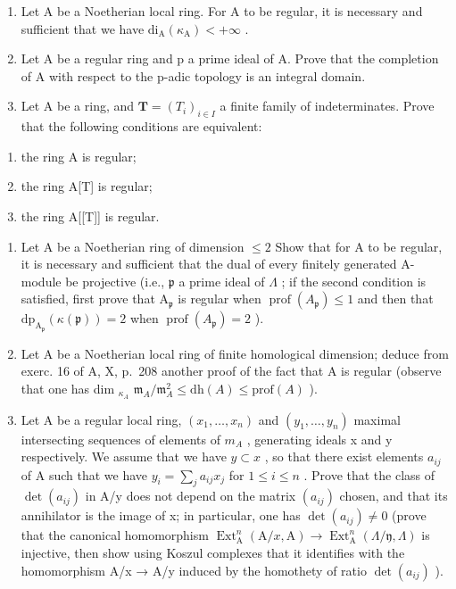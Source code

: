 
\begin{enumerate}
\def\labelenumi{\arabic{enumi})}
\item
  Let A be a Noetherian local ring. For A to be regular, it is necessary and sufficient that we have \(\mathrm{di}_{\mathrm{A}}(\kappa_{\mathrm{A}})<+\infty\) .
\item
  Let A be a regular ring and p a prime ideal of A. Prove that the completion of A with respect to the p-adic topology is an integral domain.
\item
  Let A be a ring, and \(\mathbf{T} = (T_i)_{i\in I}\) a finite family of indeterminates. Prove that the following conditions are equivalent:
\end{enumerate}

\begin{enumerate}
\def\labelenumi{(\roman{enumi})}
\item
  the ring A is regular;
\item
  the ring A{[}T{]} is regular;
\item
  the ring A{[}{[}T{]}{]} is regular.
\end{enumerate}

\begin{enumerate}
\def\labelenumi{\arabic{enumi})}
\setcounter{enumi}{3}
\item
  Let A be a Noetherian ring of dimension \(\leqslant 2\) Show that for A to be regular, it is necessary and sufficient that the dual of every finitely generated A-module be projective (i.e., \(\mathfrak{p}\) a prime ideal of \(\Lambda\) ; if the second condition is satisfied, first prove that \(\mathrm{A}_{\mathfrak{p}}\) is regular when \(\operatorname{prof}(A_{\mathfrak{p}}) \leqslant 1\) and then that \(\mathrm{dp}_{\mathrm{A}_{\mathfrak{p}}}(\kappa(\mathfrak{p})) = 2\) when \(\operatorname{prof}(A_{\mathfrak{p}}) = 2\) ).
\item
  Let A be a Noetherian local ring of finite homological dimension; deduce from exerc. 16 of A, X, p.~208 another proof of the fact that A is regular (observe that one has dim \(_{\kappa_A}\) \(\mathfrak{m}_A/\mathfrak{m}_A^2 \leqslant \mathrm{dh}(A) \leqslant \mathrm{prof}(A)\) ).
\item
  Let A be a regular local ring, \((x_{1},\ldots,x_{n})\) and \((y_{1},\ldots,y_{n})\) maximal intersecting sequences of elements of \(m_{A}\) , generating ideals x and y respectively. We assume that we have \(y \subset x\) , so that there exist elements \(a_{ij}\) of A such that we have \(y_{i} = \sum_{j} a_{ij} x_{j}\) for \(1 \leqslant i \leqslant n\) . Prove that the class of \(\det(a_{ij})\) in A/y does not depend on the matrix \((a_{ij})\) chosen, and that its annihilator is the image of x; in particular, one has \(\det(a_{ij}) \neq 0\) (prove that the canonical homomorphism \(\operatorname{Ext}_{\mathrm{A}}^{n}(\mathrm{A}/x,\mathrm{A}) \to \operatorname{Ext}_{\mathrm{A}}^{n}(\Lambda/\mathfrak{y},\Lambda)\) is injective, then show using Koszul complexes that it identifies with the homomorphism A/x → A/y induced by the homothety of ratio \(\det(a_{ij})\) ).
\end{enumerate}

